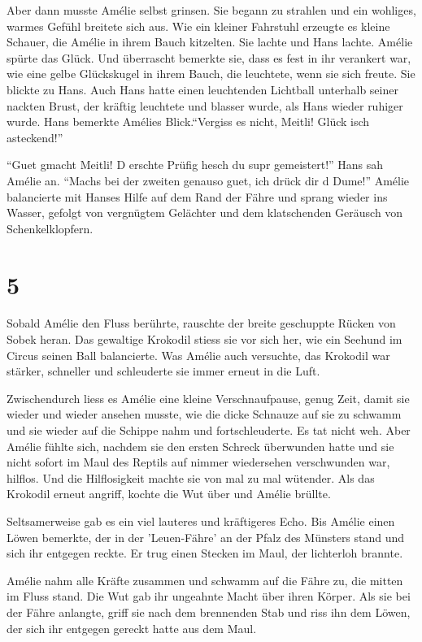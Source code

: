 \documentclass[11pt,titlepage,a5paper]{book}
\begin{document}
Aber dann musste Amélie selbst grinsen. Sie begann zu strahlen und ein wohliges, warmes Gefühl breitete sich aus. Wie ein kleiner Fahrstuhl erzeugte es kleine Schauer, die Amélie in ihrem Bauch kitzelten. Sie lachte und Hans lachte. Amélie spürte das Glück. Und überrascht bemerkte sie, dass es fest in ihr verankert war, wie eine gelbe Glückskugel in ihrem Bauch, die leuchtete, wenn sie sich freute. Sie blickte zu Hans. Auch Hans hatte einen leuchtenden Lichtball unterhalb seiner nackten Brust, der kräftig leuchtete und blasser wurde, als Hans wieder ruhiger wurde. Hans bemerkte Amélies Blick."`Vergiss es nicht, Meitli! Glück isch asteckend!"'

"`Guet gmacht Meitli! D erschte Prüfig hesch du supr gemeistert!"' Hans sah Amélie an. "`Machs bei der zweiten genauso guet, ich drück dir d Dume!"' Amélie balancierte mit Hanses Hilfe auf dem Rand der Fähre und sprang wieder ins Wasser, gefolgt von vergnügtem Gelächter und dem klatschenden Geräusch von Schenkelklopfern.

\section*{5}

Sobald Amélie den Fluss berührte, rauschte der breite geschuppte Rücken von Sobek heran. Das gewaltige Krokodil stiess sie vor sich her, wie ein Seehund im Circus seinen Ball balancierte. Was Amélie auch versuchte, das Krokodil war stärker, schneller und schleuderte sie immer erneut in die Luft.

Zwischendurch liess es Amélie eine kleine Verschnaufpause, genug Zeit, damit sie wieder und wieder ansehen musste, wie die dicke Schnauze auf sie zu schwamm und sie wieder auf die Schippe nahm und fortschleuderte. Es tat nicht weh. Aber Amélie fühlte sich, nachdem sie den ersten Schreck überwunden hatte und sie nicht sofort im Maul des Reptils auf nimmer wiedersehen verschwunden war, hilflos. Und die Hilflosigkeit machte sie von mal zu mal wütender. Als das Krokodil erneut angriff, kochte die Wut über und Amélie brüllte.

Seltsamerweise gab es ein viel lauteres und kräftigeres Echo. Bis Amélie einen Löwen bemerkte, der in der 'Leuen-Fähre' an der Pfalz des Münsters stand und sich ihr entgegen reckte. Er trug einen Stecken im Maul, der lichterloh brannte.

Amélie nahm alle Kräfte zusammen und schwamm auf die Fähre zu, die mitten im Fluss stand. Die Wut gab ihr ungeahnte Macht über ihren Körper. Als sie bei der Fähre anlangte, griff sie nach dem brennenden Stab und riss ihn dem Löwen, der sich ihr entgegen gereckt hatte aus dem Maul.
\end{document}
